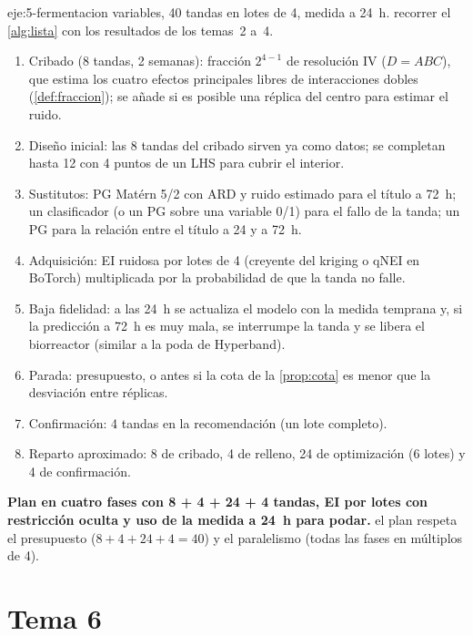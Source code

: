 \begin{solucion}{eje:5-fermentacion}
 variables, 40 tandas en lotes de 4, medida a 24~h.
\planteamiento recorrer el \cref{alg:lista} con los resultados de los temas~2 a~4.
\pasos
\begin{enumerate}[label=\arabic*.]
  \item Cribado (8 tandas, 2 semanas): fracción $2^{4-1}$ de resolución IV ($D=ABC$), que estima los cuatro efectos principales libres de interacciones dobles (\cref{def:fraccion}); se añade si es posible una réplica del centro para estimar el ruido.
  \item Diseño inicial: las 8 tandas del cribado sirven ya como datos; se completan hasta 12 con 4 puntos de un LHS para cubrir el interior.
  \item Sustitutos: PG Matérn 5/2 con ARD y ruido estimado para el título a 72~h; un clasificador (o un PG sobre una variable 0/1) para el fallo de la tanda; un PG para la relación entre el título a 24 y a 72~h.
  \item Adquisición: EI ruidosa por lotes de 4 (creyente del kriging o qNEI en BoTorch) multiplicada por la probabilidad de que la tanda no falle.
  \item Baja fidelidad: a las 24~h se actualiza el modelo con la medida temprana y, si la predicción a 72~h es muy mala, se interrumpe la tanda y se libera el biorreactor (similar a la poda de Hyperband).
  \item Parada: presupuesto, o antes si la cota de la \cref{prop:cota} es menor que la desviación entre réplicas.
  \item Confirmación: 4 tandas en la recomendación (un lote completo).
  \item Reparto aproximado: 8 de cribado, 4 de relleno, 24 de optimización (6 lotes) y 4 de confirmación.
\end{enumerate}
\resultado \textbf{Plan en cuatro fases con 8 + 4 + 24 + 4 tandas, EI por lotes con restricción oculta y uso de la medida a 24~h para podar.}
\comprobacion el plan respeta el presupuesto ($8+4+24+4=40$) y el paralelismo (todas las fases en múltiplos de 4).
\end{solucion}

\section{Tema 6}

